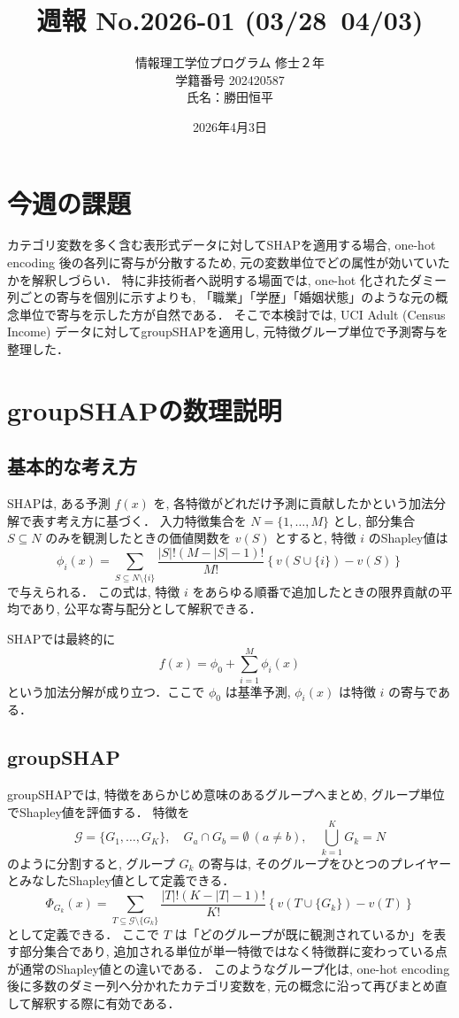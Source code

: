 \documentclass{article}
\title{\vspace{-3cm}週報 No.2026-01 (03/28~04/03)}
\author{情報理工学位プログラム 修士２年\\ 学籍番号 202420587 \\氏名：勝田恒平}
\date{2026年4月3日}
\begin{document}
\maketitle

\section{今週の課題}
カテゴリ変数を多く含む表形式データに対してSHAPを適用する場合, one-hot encoding 後の各列に寄与が分散するため, 元の変数単位でどの属性が効いていたかを解釈しづらい．
特に非技術者へ説明する場面では, one-hot 化されたダミー列ごとの寄与を個別に示すよりも, 「職業」「学歴」「婚姻状態」のような元の概念単位で寄与を示した方が自然である．
そこで本検討では, UCI Adult (Census Income) データに対してgroupSHAPを適用し, 元特徴グループ単位で予測寄与を整理した．

\section{groupSHAPの数理説明}
\subsection{基本的な考え方}
SHAPは, ある予測 $f(x)$ を, 各特徴がどれだけ予測に貢献したかという加法分解で表す考え方に基づく\cite{lundberg2017unified}．
入力特徴集合を $N=\{1,\dots,M\}$ とし, 部分集合 $S \subseteq N$ のみを観測したときの価値関数を $v(S)$ とすると, 特徴 $i$ のShapley値は
\[
\phi_i(x)
=
\sum_{S \subseteq N \setminus \{i\}}
\frac{|S|!(M-|S|-1)!}{M!}
\left\{v(S \cup \{i\}) - v(S)\right\}
\]
で与えられる．
この式は, 特徴 $i$ をあらゆる順番で追加したときの限界貢献の平均であり, 公平な寄与配分として解釈できる\cite{lundberg2017unified}．

SHAPでは最終的に
\[
f(x) = \phi_0 + \sum_{i=1}^{M}\phi_i(x)
\]
という加法分解が成り立つ．ここで $\phi_0$ は基準予測, $\phi_i(x)$ は特徴 $i$ の寄与である．

\subsection{groupSHAP}
groupSHAPでは, 特徴をあらかじめ意味のあるグループへまとめ, グループ単位でShapley値を評価する\cite{jullum2021groupshapley}．
特徴を
\[
\mathcal{G}=\{G_1,\dots,G_K\}, \quad
G_a \cap G_b = \emptyset \ (a \neq b), \quad
\bigcup_{k=1}^{K} G_k = N
\]
のように分割すると, グループ $G_k$ の寄与は, そのグループをひとつのプレイヤーとみなしたShapley値として定義できる\cite{owen1977values,jullum2021groupshapley}．
\[
\Phi_{G_k}(x)
=
\sum_{T \subseteq \mathcal{G} \setminus \{G_k\}}
\frac{|T|!(K-|T|-1)!}{K!}
\left\{
v(T \cup \{G_k\}) - v(T)
\right\}
\]
として定義できる．
ここで $T$ は「どのグループが既に観測されているか」を表す部分集合であり, 追加される単位が単一特徴ではなく特徴群に変わっている点が通常のShapley値との違いである．
このようなグループ化は, one-hot encoding 後に多数のダミー列へ分かれたカテゴリ変数を, 元の概念に沿って再びまとめ直して解釈する際に有効である\cite{jullum2021groupshapley}．
\end{document}

